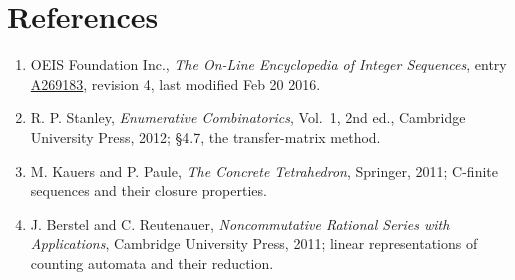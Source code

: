 \documentclass[11pt]{article}
\theoremstyle{definition}
\begin{document}
\section{References}

\begin{enumerate}

\item OEIS Foundation Inc., \emph{The On-Line Encyclopedia of Integer Sequences}, entry \href{https://oeis.org/A269183}{A269183}, revision 4, last modified Feb 20 2016.

\item R. P. Stanley, \emph{Enumerative Combinatorics}, Vol.~1, 2nd ed., Cambridge University Press, 2012; \S4.7, the transfer-matrix method.

\item M. Kauers and P. Paule, \emph{The Concrete Tetrahedron}, Springer, 2011; C-finite sequences and their closure properties.

\item J. Berstel and C. Reutenauer, \emph{Noncommutative Rational Series with Applications}, Cambridge University Press, 2011; linear representations of counting automata and their reduction.

\end{enumerate}
\end{document}
